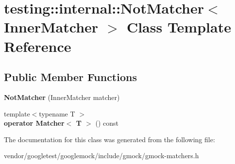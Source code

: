 \hypertarget{classtesting_1_1internal_1_1_not_matcher}{}\section{testing\+:\+:internal\+:\+:Not\+Matcher$<$ Inner\+Matcher $>$ Class Template Reference}
\label{classtesting_1_1internal_1_1_not_matcher}
\subsection*{Public Member Functions}
\begin{DoxyCompactItemize}
\item 
\mbox{\label{classtesting_1_1internal_1_1_not_matcher_a77bd397c9974e4e49acb84eeb624dce1}} 
{\bfseries Not\+Matcher} (Inner\+Matcher matcher)
\item 
\mbox{\label{classtesting_1_1internal_1_1_not_matcher_a87ad7beadf9def58cc053229e99e8625}} 
{\footnotesize template$<$typename T $>$ }\\{\bfseries operator Matcher$<$ T $>$} () const
\end{DoxyCompactItemize}


The documentation for this class was generated from the following file\+:\begin{DoxyCompactItemize}
\item 
vendor/googletest/googlemock/include/gmock/gmock-\/matchers.\+h\end{DoxyCompactItemize}
